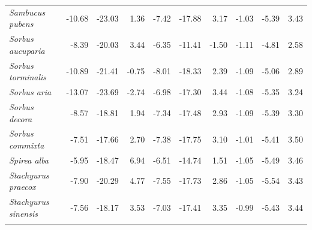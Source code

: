 \documentclass[11pt]{article}
\begin{document}
\begin{longtable}{lrrrrrrrrr}
  \emph{Sambucus pubens} & -10.68 & -23.03 & 1.36 & -7.42 & -17.88 & 3.17 & -1.03 & -5.39 & 3.43 \\ 
  \emph{Sorbus aucuparia} & -8.39 & -20.03 & 3.44 & -6.35 & -11.41 & -1.50 & -1.11 & -4.81 & 2.58 \\ 
  \emph{Sorbus torminalis} & -10.89 & -21.41 & -0.75 & -8.01 & -18.33 & 2.39 & -1.09 & -5.06 & 2.89 \\ 
  \emph{Sorbus aria} & -13.07 & -23.69 & -2.74 & -6.98 & -17.30 & 3.44 & -1.08 & -5.35 & 3.24 \\ 
  \emph{Sorbus decora} & -8.57 & -18.81 & 1.94 & -7.34 & -17.48 & 2.93 & -1.09 & -5.39 & 3.30 \\ 
  \emph{Sorbus commixta} & -7.51 & -17.66 & 2.70 & -7.38 & -17.75 & 3.10 & -1.01 & -5.41 & 3.50 \\ 
  \emph{Spirea alba} & -5.95 & -18.47 & 6.94 & -6.51 & -14.74 & 1.51 & -1.05 & -5.49 & 3.46 \\ 
  \emph{Stachyurus praecox} & -7.90 & -20.29 & 4.77 & -7.55 & -17.73 & 2.86 & -1.05 & -5.54 & 3.43 \\ 
  \emph{Stachyurus sinensis} & -7.56 & -18.17 & 3.53 & -7.03 & -17.41 & 3.35 & -0.99 & -5.43 & 3.44 \\ 
  \hline
\label{tab:tablesupp2}
\end{longtable}
\endgroup \clearpage \pagebreak 
\end{document}
